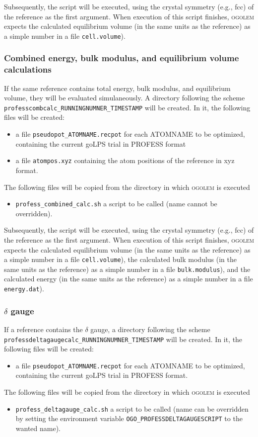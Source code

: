 \documentclass[a4paper,10pt]{scrbook}
\newcommand{\ogo}{\textsc{ogolem}}
\begin{document}
Subsequently, the script will be executed, using the crystal symmetry (e.g., fcc) of the reference as the first argument. When execution of
this script finishes, \ogo{} expects the calculated equilibrium volume (in the same units as the reference) as
a simple number in a file \texttt{cell.volume}).

\subsubsection{Combined energy, bulk modulus, and equilibrium volume calculations}
If the same reference contains total energy, bulk modulus, and equilibrium volume, they
will be evaluated simulaneously. A directory following the scheme
\texttt{professcombcalc\_RUNNINGNUMNER\_TIMESTAMP} will be created. In it, the following files will be created:
\begin{itemize}
 \item a file \texttt{pseudopot\_ATOMNAME.recpot} for each ATOMNAME to be optimized,
 containing the current goLPS trial in PROFESS format
 \item a file \texttt{atompos.xyz} containing the atom positions of the reference in
 xyz format.
\end{itemize}
The following files will be copied from the directory in which \ogo{} is executed
\begin{itemize}
 \item \texttt{profess\_combined\_calc.sh} a script to be called (name cannot be
 overridden).
\end{itemize}

Subsequently, the script will be executed, using the crystal symmetry (e.g., fcc) of the reference as the first argument. When execution of
this script finishes, \ogo{} expects the calculated equilibrium volume (in the same units as the reference) as
a simple number in a file \texttt{cell.volume}), the calculated bulk modulus (in the same units as the reference) as
a simple number in a file \texttt{bulk.modulus}), and the calculated energy (in the same units as the reference) as
a simple number in a file \texttt{energy.dat}).

\subsubsection{$\delta$ gauge}
If a reference contains the $\delta$ gauge, a directory following the scheme
\texttt{professdeltagaugecalc\_RUNNINGNUMNER\_TIMESTAMP} will be created. In it, the following files will be created:
\begin{itemize}
 \item a file \texttt{pseudopot\_ATOMNAME.recpot} for each ATOMNAME to be optimized,
 containing the current goLPS trial in PROFESS format.
\end{itemize}
The following files will be copied from the directory in which \ogo{} is executed
\begin{itemize}
 \item \texttt{profess\_deltagauge\_calc.sh} a script to be called (name can be overridden
 by setting the environment variable \texttt{OGO\_PROFESSDELTAGAUGESCRIPT} to the wanted
 name).
\end{itemize}
\end{document}
